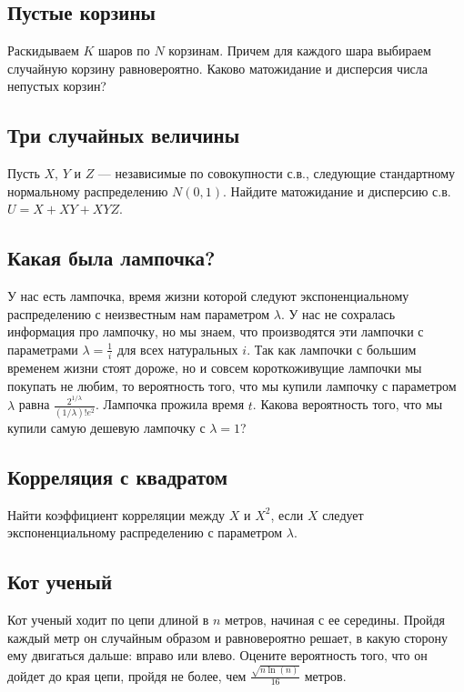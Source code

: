 \documentclass[12pt]{article}
\begin{document}
\subsection{Пустые корзины}

Раскидываем $K$ шаров по $N$ корзинам. Причем для каждого шара выбираем случайную корзину равновероятно. Каково матожидание и дисперсия числа непустых корзин?



\subsection{Три случайных величины}

Пусть $X$, $Y$ и $Z$ --- независимые по совокупности с.в., следующие стандартному нормальному распределению $N(0, 1)$. Найдите матожидание и дисперсию с.в. $U = X + XY + XYZ$. 



\subsection{Какая была лампочка?}

У нас есть лампочка, время жизни которой следуют экспоненциальному распределению с неизвестным нам параметром $\lambda$. У нас не сохралась информация про лампочку, но мы знаем, что производятся эти лампочки с параметрами $\lambda = \frac{1}{i}$ для всех натуральных $i$. Так как лампочки с большим временем жизни стоят дороже, но и совсем короткоживущие лампочки мы покупать не любим, то вероятность того, что мы купили лампочку с параметром $\lambda$ равна $\frac{2^{1/\lambda}}{(1/\lambda)!e^2}$. Лампочка прожила время $t$. Какова вероятность того, что мы купили самую дешевую лампочку с $\lambda = 1$?




\subsection{Корреляция с квадратом}

Найти коэффициент корреляции между $X$ и $X^2$, если $X$ следует экспоненциальному распределению с параметром $\lambda$.



\subsection{Кот ученый}

Кот ученый ходит по цепи длиной в $n$ метров, начиная с ее середины. Пройдя каждый метр он случайным образом и равновероятно решает, в какую сторону ему двигаться дальше: вправо или влево. Оцените вероятность того, что он дойдет до края цепи, пройдя не более, чем $\frac{\sqrt{n \ln(n)}}{16}$ метров.
\end{document}
